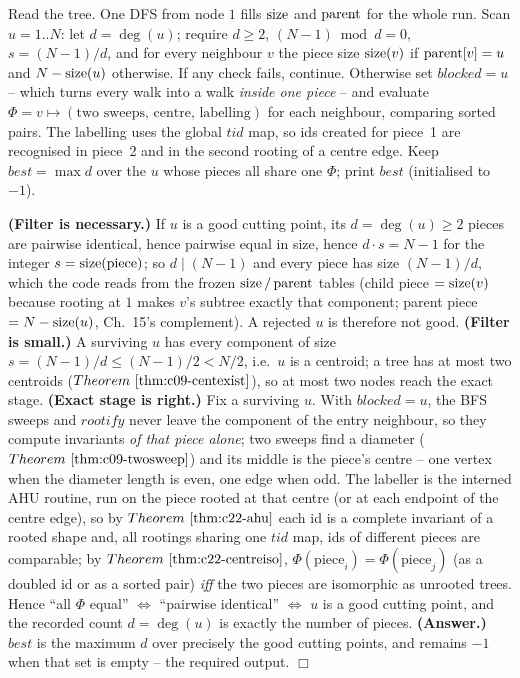 Read the tree. One DFS from node \(1\) fills \(\operatorname{size}\) and \(\operatorname{parent}\) for the whole run.
Scan \(u=1..N\): let \(d=\deg(u)\); require \(d\ge2\), \((N-1)\bmod d=0\), \(s=(N-1)/d\), and
for every neighbour \(v\) the piece size \(\operatorname{size}(v)\) if \(\operatorname{parent}[v]=u\) and \(N-\operatorname{size}(u)\)
otherwise. If any check fails, continue. Otherwise set \(\mathit{blocked}=u\) -- which turns
every walk into a walk \emph{inside one piece} -- and evaluate
\(\Phi=v\!\mapsto\!(\text{two sweeps, centre, labelling})\) for each neighbour, comparing
sorted pairs. The labelling uses the global \(\mathit{tid}\) map, so ids created for
piece~1 are recognised in piece~2 and in the second rooting of a centre edge. Keep
\(\mathit{best}=\max d\) over the \(u\) whose pieces all share one \(\Phi\); print
\(\mathit{best}\) (initialised to \(-1\)).

\begin{proofbox}
\textbf{(Filter is necessary.)} If \(u\) is a good cutting point, its \(d=\deg(u)\ge2\)
pieces are pairwise identical, hence pairwise equal in size, hence \(d\cdot s=N-1\) for the
integer \(s=\operatorname{size}(\text{piece})\); so \(d\mid(N-1)\) and every piece has size \((N-1)/d\),
which the code reads from the frozen \(\operatorname{size}/\operatorname{parent}\) tables (child piece \(=\operatorname{size}(v)\)
because rooting at \(1\) makes \(v\)'s subtree exactly that component; parent piece
\(=N-\operatorname{size}(u)\), Ch.~15's complement). A rejected \(u\) is therefore not good.
\textbf{(Filter is small.)} A surviving \(u\) has every component of size
\(s=(N-1)/d\le(N-1)/2<N/2\), i.e.\ \(u\) is a centroid; a tree has at most two centroids
(\(\thmref{c09-centexist}\)), so at most two nodes reach the exact stage.
\textbf{(Exact stage is right.)} Fix a surviving \(u\). With \(\mathit{blocked}=u\), the
BFS sweeps and \(\mathit{rootify}\) never leave the component of the entry neighbour, so
they compute invariants \emph{of that piece alone}; two sweeps find a diameter
(\(\thmref{c09-twosweep}\)) and its middle is the piece's centre -- one vertex when the
diameter length is even, one edge when odd. The labeller is the interned AHU routine, run on
the piece rooted at that centre (or at each endpoint of the centre edge), so by
\(\thmref{c22-ahu}\) each id is a complete invariant of a rooted shape and, all rootings
sharing one \(\mathit{tid}\) map, ids of different pieces are comparable; by
\(\thmref{c22-centreiso}\), \(\Phi(\text{piece}_i)=\Phi(\text{piece}_j)\) (as a doubled id
or as a sorted pair) \emph{iff} the two pieces are isomorphic as unrooted trees. Hence
``all \(\Phi\) equal'' \(\iff\) ``pairwise identical'' \(\iff\) \(u\) is a good cutting
point, and the recorded count \(d=\deg(u)\) is exactly the number of pieces.
\textbf{(Answer.)} \(\mathit{best}\) is the maximum \(d\) over precisely the good cutting
points, and remains \(-1\) when that set is empty -- the required output. \(\Box\)
\end{proofbox}

